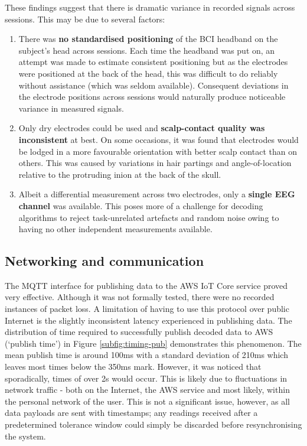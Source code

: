 These findings suggest that there is dramatic variance in recorded signals across sessions. This may be due to several factors:
\begin{enumerate}
    \item There was \textbf{no standardised positioning} of the BCI headband on the subject's head across sessions. Each time the headband was put on, an attempt was made to estimate consistent positioning but as the electrodes were positioned at the back of the head, this was difficult to do reliably without assistance (which was seldom available). Consequent deviations in the electrode positions across sessions would naturally produce noticeable variance in measured signals.
    \item Only dry electrodes could be used and \textbf{scalp-contact quality was inconsistent} at best. On some occasions, it was found that electrodes would be lodged in a more favourable orientation with better scalp contact than on others. This was caused by variations in hair partings and angle-of-location relative to the protruding inion at the back of the skull. 
    \item Albeit a differential measurement across two electrodes, only a \textbf{single EEG channel} was available. This poses more of a challenge for decoding algorithms to reject task-unrelated artefacts and random noise owing to having no other independent measurements available.  
\end{enumerate}

\subsection{Networking and communication}
The MQTT interface for publishing data to the AWS IoT Core service proved very effective. Although it was not formally tested, there were no recorded instances of packet loss. A limitation of having to use this protocol over public Internet is the slightly inconsistent latency experienced in publishing data. The distribution of time required to successfully publish decoded data to AWS (`publish time') in Figure \ref{subfig:timing-pub} demonstrates this phenomenon. The mean publish time is around 100ms with a standard deviation of 210ms which leaves most times below the 350ms mark. However, it was noticed that sporadically, times of over 2s would occur. This is likely due to fluctuations in network traffic - both on the Internet, the AWS service and most likely, within the personal network of the user. This is not a significant issue, however, as all data payloads are sent with timestamps; any readings received after a predetermined tolerance window could simply be discarded before resynchronising the system. 

